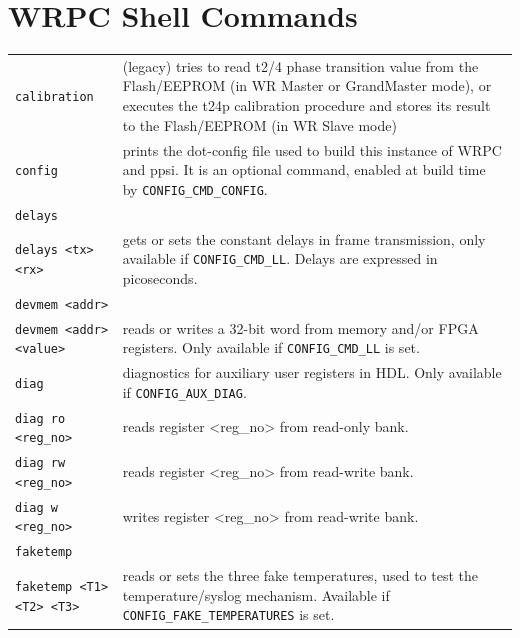 \documentclass[a4paper, 12pt]{article}
\newcommand{\code}[1]{\texttt{#1}}
\begin{document}


\appendix
\clearpage
\section{WRPC Shell Commands}
\label{WRPC Shell commands}

\footnotesize
\renewcommand\arraystretch{1.5}
\begin{longtable}{  p{7.5cm}  p{7cm} }

  \code{calibration} & (legacy) tries to read t2/4 phase transition value from
    the Flash/EEPROM (in WR Master or GrandMaster mode), or executes the t24p
    calibration procedure and stores its result to the Flash/EEPROM (in WR 
    Slave mode) \\

  \code{config} & prints the dot-config file used to build this instance of
    WRPC and ppsi. It is an optional command, enabled at build time by
    \texttt{CONFIG\_CMD\_CONFIG}. \\

  \code{delays}& \\
  \code{delays <tx> <rx>} & gets or sets the constant delays in frame
    transmission, only available if \texttt{CONFIG\_CMD\_LL}. Delays are
    expressed in picoseconds. \\

  \code{devmem <addr>} &  \\
  \code{devmem <addr> <value>} & reads or writes a 32-bit word from memory
    and/or FPGA registers. Only available if \texttt{CONFIG\_CMD\_LL} is
    set. \\

  \code{diag} & diagnostics for auxiliary user registers in HDL. Only available
    if \texttt{CONFIG\_AUX\_DIAG}.\\

  \code{diag ro <reg\_no>} & reads register <reg\_no> from read-only bank.\\

  \code{diag rw <reg\_no>} & reads register <reg\_no> from read-write bank.\\

  \code{diag w <reg\_no>} & writes register <reg\_no> from read-write bank. \\

  \code{faketemp} &  \\
  \code{faketemp <T1> <T2> <T3>} & reads or sets the three fake temperatures,
    used to test the temperature/syslog mechanism. Available if
    \texttt{CONFIG\_FAKE\_TEMPERATURES} is set. \\


\end{longtable}
\end{document}
